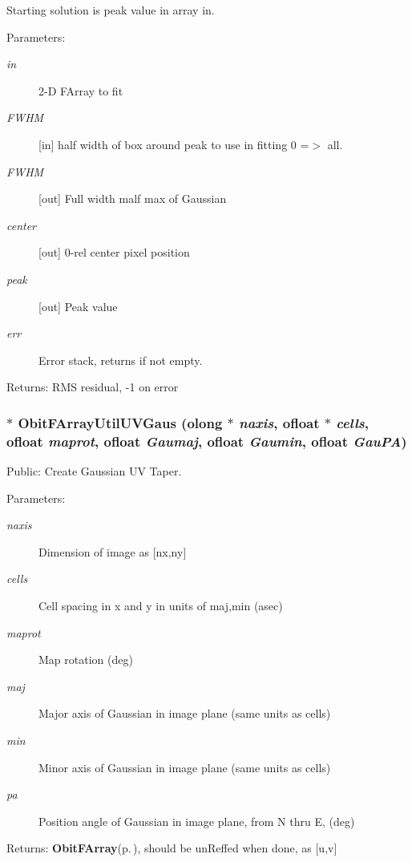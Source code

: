 Starting solution is peak value in array in. \begin{Desc}
\item[Parameters:]
\begin{description}
\item[{\em in}]2-D FArray to fit \item[{\em FWHM}][in] half width of box around peak to use in fitting 0 =$>$ all. \item[{\em FWHM}][out] Full width malf max of Gaussian \item[{\em center}][out] 0-rel center pixel position \item[{\em peak}][out] Peak value \item[{\em err}]Error stack, returns if not empty. \end{description}
\end{Desc}
\begin{Desc}
\item[Returns:]RMS residual, -1 on error \end{Desc}
\subsubsection{$\ast$ Obit\-FArray\-Util\-UVGaus ({\bf olong} $\ast$ {\em naxis}, {\bf ofloat} $\ast$ {\em cells}, {\bf ofloat} {\em maprot}, {\bf ofloat} {\em Gaumaj}, {\bf ofloat} {\em Gaumin}, {\bf ofloat} {\em Gau\-PA})}\label{ObitFArrayUtil_8h_a2}


Public: Create Gaussian UV Taper. 

\begin{Desc}
\item[Parameters:]
\begin{description}
\item[{\em naxis}]Dimension of image as [nx,ny] \item[{\em cells}]Cell spacing in x and y in units of maj,min (asec) \item[{\em maprot}]Map rotation (deg) \item[{\em maj}]Major axis of Gaussian in image plane (same units as cells) \item[{\em min}]Minor axis of Gaussian in image plane (same units as cells) \item[{\em pa}]Position angle of Gaussian in image plane, from N thru E, (deg) \end{description}
\end{Desc}
\begin{Desc}
\item[Returns:]{\bf Obit\-FArray}{\rm (p.\,\pageref{structObitFArray})}, should be un\-Reffed when done, as [u,v] \end{Desc}
